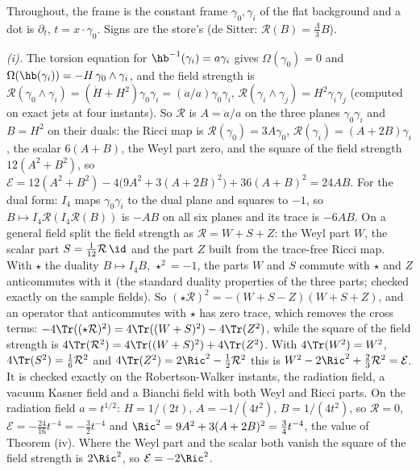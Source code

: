 Throughout, the frame is the constant frame $\gamma_{0}, \gamma_{i}$ of the flat background and a dot is $\partial_{t}$, $t = x \cdot \gamma_{0}$. Signs are the store's (de Sitter: $\mathcal{R}(B) = \tfrac{\Lambda}{3}B$).

\emph{(i).} The torsion equation for $\hb^{-1}(\gamma_{i}) = a\gamma_{i}$ gives $\Omega(\gamma_{0}) = 0$ and $\Omega(\hb(\gamma_{i})) = -H\,\gamma_{0} \wedge \gamma_{i}$, and the field strength is $\mathcal{R}(\gamma_{0} \wedge \gamma_{i}) = (\dot H + H^{2})\gamma_{0}\gamma_{i} = (\ddot a/a)\gamma_{0}\gamma_{i}$, $\mathcal{R}(\gamma_{i} \wedge \gamma_{j}) = H^{2}\gamma_{i}\gamma_{j}$ (computed on exact jets at four instants). So $\mathcal{R}$ is $A = \ddot a/a$ on the three planes $\gamma_{0}\gamma_{i}$ and $B = H^{2}$ on their duals: the Ricci map is $\mathcal{R}(\gamma_{0}) = 3A\gamma_{0}$, $\mathcal{R}(\gamma_{i}) = (A + 2B)\gamma_{i}$, the scalar $6(A + B)$, the Weyl part zero, and the square of the field strength $12(A^{2} + B^{2})$, so $\mathcal{E} = 12(A^{2} + B^{2}) - 4\bigl(9A^{2} + 3(A + 2B)^{2}\bigr) + 36(A + B)^{2} = 24AB$. For the dual form: $I_{4}$ maps $\gamma_{0}\gamma_{i}$ to the dual plane and squares to $-1$, so $B \mapsto I_{4}\mathcal{R}(I_{4}\mathcal{R}(B))$ is $-AB$ on all six planes and its trace is $-6AB$. On a general field split the field strength as $\mathcal{R} = W + S + Z$: the Weyl part $W$, the scalar part $S = \tfrac{1}{12}\mathcal{R}\,\id$ and the part $Z$ built from the trace-free Ricci map. With $\star$ the duality $B \mapsto I_{4}B$, $\star^{2} = -1$, the parts $W$ and $S$ commute with $\star$ and $Z$ anticommutes with it (the standard duality properties of the three parts; checked exactly on the sample fields). So $(\star\mathcal{R})^{2} = -(W + S - Z)(W + S + Z)$, and an operator that anticommutes with $\star$ has zero trace, which removes the cross terms: $-4\Tr((\star\mathcal{R})^{2}) = 4\Tr((W + S)^{2}) - 4\Tr(Z^{2})$, while the square of the field strength is $4\Tr(\mathcal{R}^{2}) = 4\Tr((W + S)^{2}) + 4\Tr(Z^{2})$. With $4\Tr(W^{2}) = W^{2}$, $4\Tr(S^{2}) = \tfrac16\mathcal{R}^{2}$ and $4\Tr(Z^{2}) = 2\Ric^{2} - \tfrac12\mathcal{R}^{2}$ this is $W^{2} - 2\Ric^{2} + \tfrac23\mathcal{R}^{2} = \mathcal{E}$. It is checked exactly on the Robertson-Walker instants, the radiation field, a vacuum Kasner field and a Bianchi field with both Weyl and Ricci parts. On the radiation field $a = t^{1/2}$: $H = 1/(2t)$, $A = -1/(4t^{2})$, $B = 1/(4t^{2})$, so $\mathcal{R} = 0$, $\mathcal{E} = -\tfrac{24}{16}t^{-4} = -\tfrac32 t^{-4}$ and $\Ric^{2} = 9A^{2} + 3(A + 2B)^{2} = \tfrac34 t^{-4}$, the value of Theorem (iv). Where the Weyl part and the scalar both vanish the square of the field strength is $2\Ric^{2}$, so $\mathcal{E} = -2\Ric^{2}$.

